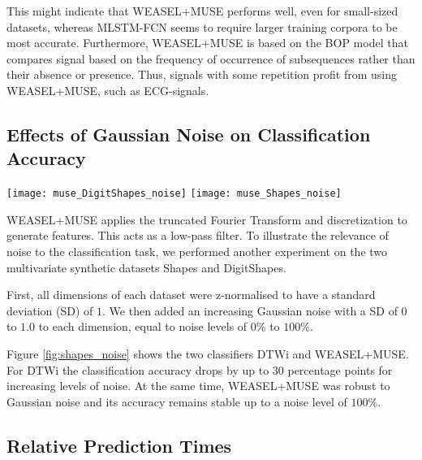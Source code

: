 \documentclass[sigconf]{acmart}
\begin{document}
This might indicate that WEASEL+MUSE performs well, even for small-sized datasets, whereas MLSTM-FCN seems to require larger training corpora to be most accurate. 
Furthermore, WEASEL+MUSE is based on the BOP model that compares signal based on the frequency of occurrence of subsequences rather than their absence or presence. Thus, signals with some repetition profit from using WEASEL+MUSE, such as ECG-signals.


\subsection{Effects of Gaussian Noise on Classification Accuracy}\label{subsec:noise}

\begin{figure*}[t]
	\begin{centering}
		\texttt{[image: muse\_DigitShapes\_noise]}
		\texttt{[image: muse\_Shapes\_noise]}
	\end{centering}
	\caption{Effects of Gaussian noise on classification accuracy. With increasing levels of noise added, the accuracy of DTW drops and remains stable for WEASEL+MUSE. \label{fig:shapes_noise}}
\end{figure*}

WEASEL+MUSE applies the truncated Fourier Transform and discretization to generate features. This acts as a low-pass filter. To illustrate the relevance of noise to the classification task, we performed another experiment on the two multivariate synthetic datasets Shapes and DigitShapes.
 
First, all dimensions of each dataset were z-normalised to have a standard deviation (SD) of $1$. We then added an increasing Gaussian noise with a SD of $0$ to $1.0$ to each dimension, equal to noise levels of $0$\% to $100$\%. 

Figure \ref{fig:shapes_noise} shows the two classifiers DTWi and WEASEL+MUSE. For DTWi the classification accuracy drops by up to $30$ percentage points for increasing levels of noise. At the same time, WEASEL+MUSE was robust to Gaussian noise and its accuracy remains stable up to a noise level of $100\%$. 




\subsection{Relative Prediction Times}\label{subsec:influence}
\end{document}
